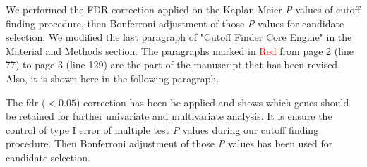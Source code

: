 \documentclass[preprint,12pt]{elsarticle}
\newenvironment{MyColorPar}[1]{%
    \leavevmode\color{#1}\ignorespaces%
}{%
}%
\begin{document}
\begin{MyColorPar}{blue}
We performed the FDR correction applied on the Kaplan-Meier \textit{P} values of cutoff finding procedure, then Bonferroni adjustment of those \textit{P} values for candidate selection.
We modified the last paragraph of "Cutoff Finder Core Engine" in the Material and Methods section.
The paragraphs marked in \textcolor{red}{Red} from page 2 (line 77) to page 3 (line 129) are the part of the manuscript that has been revised. Also, it is shown here in the following paragraph.
\\[0.3cm]

\begin{MyColorPar}{red}

The \acrfull{fdr} ($< 0.05$) correction\cite{Benjamini1995a} has been be applied and shows which genes should be retained for further univariate and multivariate analysis.
It is ensure the control of type I error of multiple test \textit{P} values during our cutoff finding procedure.
Then Bonferroni adjustment of those \textit{P} values has been used for candidate selection.
\end{MyColorPar}


\end{MyColorPar}
\end{document}
